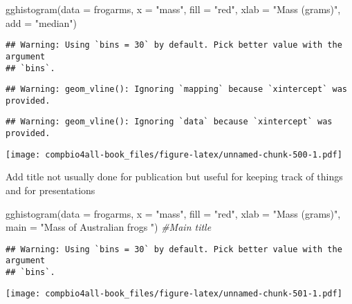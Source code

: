 \documentclass[
]{book}
\newenvironment{Shaded}{\begin{snugshade}}{\end{snugshade}}
\newcommand{\AttributeTok}[1]{\textcolor[rgb]{0.77,0.63,0.00}{#1}}
\newcommand{\CommentTok}[1]{\textcolor[rgb]{0.56,0.35,0.01}{\textit{#1}}}
\newcommand{\FunctionTok}[1]{\textcolor[rgb]{0.00,0.00,0.00}{#1}}
\newcommand{\NormalTok}[1]{#1}
\newcommand{\StringTok}[1]{\textcolor[rgb]{0.31,0.60,0.02}{#1}}
\begin{document}
\begin{Shaded}
\begin{Highlighting}[]
\FunctionTok{gghistogram}\NormalTok{(}\AttributeTok{data =}\NormalTok{ frogarms,}
            \AttributeTok{x =} \StringTok{"mass"}\NormalTok{,}
            \AttributeTok{fill =} \StringTok{"red"}\NormalTok{,}
            \AttributeTok{xlab =} \StringTok{"Mass (grams)"}\NormalTok{,}
            \AttributeTok{add =} \StringTok{"median"}\NormalTok{)}
\end{Highlighting}
\end{Shaded}

\begin{verbatim}
## Warning: Using `bins = 30` by default. Pick better value with the argument
## `bins`.
\end{verbatim}

\begin{verbatim}
## Warning: geom_vline(): Ignoring `mapping` because `xintercept` was provided.
\end{verbatim}

\begin{verbatim}
## Warning: geom_vline(): Ignoring `data` because `xintercept` was provided.
\end{verbatim}

\texttt{[image: compbio4all-book\_files/figure-latex/unnamed-chunk-500-1.pdf]}

Add title
not usually done for publication but useful for keeping track of things and for presentations

\begin{Shaded}
\begin{Highlighting}[]
\FunctionTok{gghistogram}\NormalTok{(}\AttributeTok{data =}\NormalTok{ frogarms,}
            \AttributeTok{x =} \StringTok{"mass"}\NormalTok{,}
            \AttributeTok{fill =} \StringTok{"red"}\NormalTok{,}
            \AttributeTok{xlab =} \StringTok{"Mass (grams)"}\NormalTok{,}
          \AttributeTok{main =} \StringTok{"Mass of Australian frogs "}\NormalTok{) }\CommentTok{\#Main title}
\end{Highlighting}
\end{Shaded}

\begin{verbatim}
## Warning: Using `bins = 30` by default. Pick better value with the argument
## `bins`.
\end{verbatim}

\texttt{[image: compbio4all-book\_files/figure-latex/unnamed-chunk-501-1.pdf]}
\end{document}
